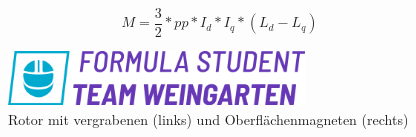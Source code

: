 \vspace{-1cm}

\begin{formel}
    \begin{equation}
        \label{eq:Moment-L}
        M = \frac{3}{2} * pp * I_d * I_q * (L_d - L_q)
    \end{equation}
    \caption[Drehmomentgleichung mit Induktivität]{}
\end{formel}

\vspace{-0.8cm}

\blindtext{}

\vspace{0.3cm}

\begin{figure}[h]
    \centering
    \includegraphics[width=0.7\textwidth]{media/pic.png}
    \caption{Rotor mit vergrabenen (links) und Oberflächenmagneten (rechts)~\cite[S. 370]{schroederElektrischeAntriebeGrundlagen2021}}
    \label{fig:Magnete}
\end{figure}

\newpage{}
\blindtext{}